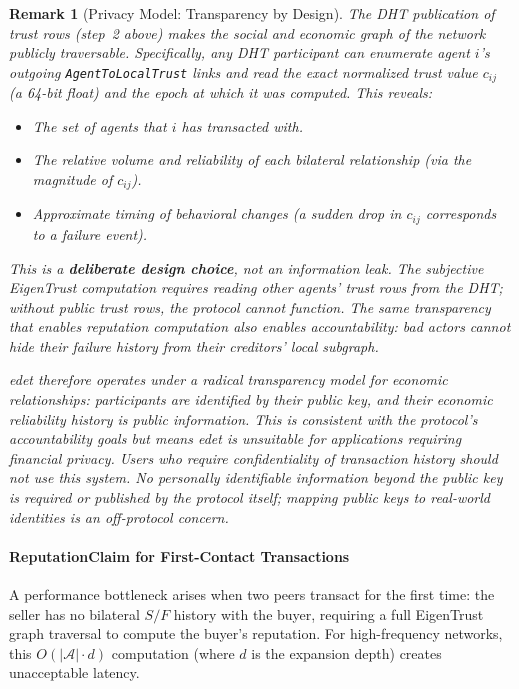 \documentclass[11pt]{article}
\newtheorem{remark}[theorem]{Remark}
\begin{document}
\begin{remark}[Privacy Model: Transparency by Design]\label{rem:privacy_model}
The DHT publication of trust rows (step~2 above) makes the social and economic graph of the network publicly traversable. Specifically, any DHT participant can enumerate agent $i$'s outgoing \texttt{AgentToLocalTrust} links and read the exact normalized trust value $c_{ij}$ (a 64-bit float) and the epoch at which it was computed. This reveals:
\begin{itemize}
    \item The set of agents that $i$ has transacted with.
    \item The relative volume and reliability of each bilateral relationship (via the magnitude of $c_{ij}$).
    \item Approximate timing of behavioral changes (a sudden drop in $c_{ij}$ corresponds to a failure event).
\end{itemize}
This is a \textbf{deliberate design choice}, not an information leak. The subjective EigenTrust computation requires reading other agents' trust rows from the DHT; without public trust rows, the protocol cannot function. The same transparency that enables reputation computation also enables accountability: bad actors cannot hide their failure history from their creditors' local subgraph.

\emph{edet} therefore operates under a \emph{radical transparency} model for economic relationships: participants are identified by their public key, and their economic reliability history is public information. This is consistent with the protocol's accountability goals but means \emph{edet} is unsuitable for applications requiring financial privacy. Users who require confidentiality of transaction history should not use this system. No personally identifiable information beyond the public key is required or published by the protocol itself; mapping public keys to real-world identities is an off-protocol concern.
\end{remark}

\paragraph{ReputationClaim for First-Contact Transactions}
\label{para:reputation_claim}

A performance bottleneck arises when two peers transact for the first time: the seller has no bilateral $S/F$ history with the buyer, requiring a full EigenTrust graph traversal to compute the buyer's reputation. For high-frequency networks, this $O(|\mathcal{A}| \cdot d)$ computation (where $d$ is the expansion depth) creates unacceptable latency.
\end{document}
